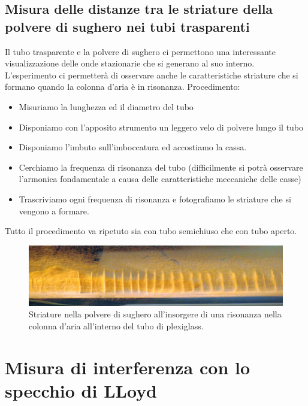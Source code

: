 \documentclass[a4paper,10pt,oneside]{article}
\begin{document}
\subsection*{Misura delle distanze tra le striature della polvere di sughero nei tubi trasparenti}

Il tubo trasparente e la polvere di sughero ci permettono una interessante visualizzazione delle onde stazionarie che si generano al suo interno. L'esperimento ci permetterà di osservare anche le caratteristiche striature che si formano quando la colonna d'aria è  in risonanza.
Procedimento:
\begin{itemize}
 \item Misuriamo la lunghezza ed il diametro del tubo
 \item Disponiamo con l'apposito strumento un leggero velo di polvere lungo il tubo
 \item Disponiamo l'imbuto sull'imboccatura ed accostiamo la cassa.
 \item Cerchiamo la frequenza di risonanza del tubo (difficilmente si potrà osservare l'armonica fondamentale a causa delle caratteristiche meccaniche delle casse)
 \item Trascriviamo ogni frequenza di risonanza e fotografiamo le striature che si vengono a formare.

\end{itemize}

Tutto il procedimento va ripetuto sia con tubo semichiuso che con tubo aperto.
\begin{figure}[H]
 \centering
 \includegraphics[width=\textwidth]{../Immagini/fondo_strie.jpg}
 \caption{Striature nella polvere di sughero all'insorgere di una risonanza nella colonna d'aria all'interno del tubo di plexiglass.}
 \label{fig:striature1}
\end{figure}

\section*{Misura di interferenza con lo specchio di LLoyd}
\end{document}
